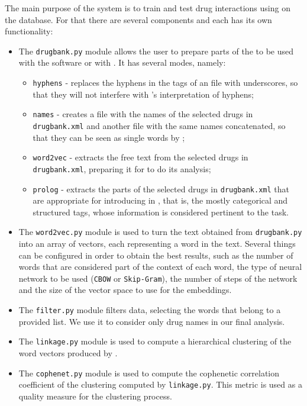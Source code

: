 \documentclass[12pt, openany]{book}
\begin{document}
The main purpose of the system is to train and test drug interactions using \alephilp on the \drugbank database. For that there are several components and each has its own functionality:
\begin{itemize}
	\item The \texttt{drugbank.py} module allows the user to prepare parts of the \xml to be used with the \wordvec software or with \alephilp. It has several modes, namely:
	\begin{itemize}
		\item \texttt{hyphens} - replaces the hyphens in the tags of an \xml file with underscores, so that they will not interfere with \prolog's interpretation of hyphens;
		\item \texttt{names} - creates a file with the names of the selected drugs in \texttt{drugbank.xml} and another file with the same names concatenated, so that they can be seen as single words by \wordvec;
 		\item \texttt{word2vec} - extracts the free text from the selected drugs in \texttt{drugbank.xml}, preparing it for \wordvec to do its analysis;
		\item \texttt{prolog} - extracts the parts of the selected drugs in \texttt{drugbank.xml} that are appropriate for introducing in \alephilp, that is, the mostly categorical and structured tags, whose information is considered pertinent to the task.
	\end{itemize}
	\item The \texttt{word2vec.py} module is used to turn the text obtained from \texttt{drugbank.py} into an array of vectors, each representing a word in the text. Several things can be configured in order to obtain the best results, such as the number of words that are considered part of the context of each word, the type of neural network to be used (\texttt{CBOW} or \texttt{Skip-Gram}), the number of steps of the network and the size of the vector space to use for the embeddings.
	\item The \texttt{filter.py} module filters \wordvec data, selecting the words that belong to a provided list. We use it to consider only drug names in our final analysis.
	\item The \texttt{linkage.py} module is used to compute a hierarchical clustering of the word vectors produced by \wordvec.
	\item The \texttt{cophenet.py} module is used to compute the cophenetic correlation coefficient of the clustering computed by \texttt{linkage.py}. This metric is used as a quality measure for the clustering process.

\end{itemize}
\end{document}
